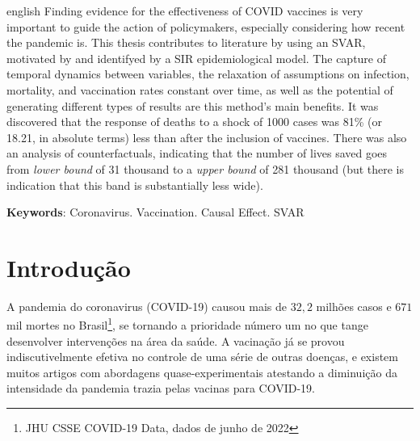 \documentclass[
	12pt,				%
	oneside,			%
	a4paper,			%
	english,			%
	brazil				%
	hyperref = {colorlinks, citecolor=c1d, linkcolor=c2d, urlcolor=c3d, colorlinks}
	]{abntex2}
\newcounter{j}
\begin{document}
\begin{resumo}[Abstract]
\begin{otherlanguage*}{english}
   Finding evidence for the effectiveness of COVID vaccines is very important to guide the action of policymakers, especially considering how recent the pandemic is. This thesis contributes to literature by using an SVAR, motivated by and identifyed by a SIR epidemiological model. The capture of temporal dynamics between variables, the relaxation of assumptions on infection, mortality, and vaccination rates constant over time, as well as the potential of generating different types of results are this method’s main benefits. It was discovered that the response of deaths to a shock of 1000 cases was 81\% (or 18.21, in absolute terms) less than after the inclusion of vaccines. There was also an analysis of counterfactuals, indicating that the number of lives saved goes from \textit{lower bound} of 31 thousand to a \textit{upper bound} of 281 thousand (but there is indication that this band is substantially less wide).

   \vspace{\onelineskip}
 
   \noindent 
   \textbf{Keywords}: Coronavirus. Vaccination. Causal Effect. SVAR
\end{otherlanguage*}
\end{resumo}


\tableofcontents*
\cleardoublepage



\textual
\pagestyle{plain}


\chapter{Introdução}
A pandemia do coronavirus (COVID-19) causou mais de $32,2$ milhões casos e $671$ mil mortes no Brasil\footnote{JHU CSSE COVID-19 Data, dados de junho de 2022}, se tornando a prioridade número um no que tange desenvolver intervenções na área da saúde. A vacinação já se provou indiscutivelmente efetiva no controle de uma série de outras doenças, e existem muitos artigos com abordagens quase-experimentais atestando a diminuição da intensidade da pandemia trazia pelas vacinas para COVID-19.
\end{document}
